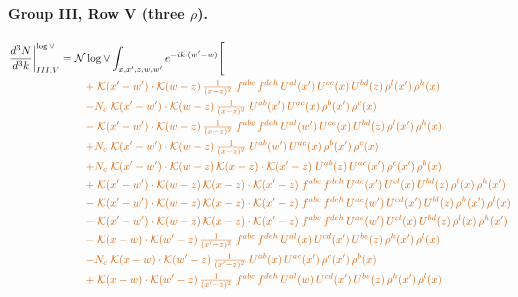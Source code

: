 \documentclass[10pt]{article}
\numberwithin{equation}{section}
\newcommand{\NNv}{\mathcal N\log\vee}
\begin{document}
\paragraph{Group III, Row V (three $\rho$).}
\begin{align}
\frac{d^3N}{d^3k}\bigg|^{\log\vee}_{III.V}={}&\NNv\int_{x,x',z,w,w'}e^{-ik\cdot(w'-w)}\Bigg[\notag\\
&\quad{\color{BFK}+\;\mathcal{K}(x'-w')\cdot\mathcal{K}(w-z)\,\tfrac{1}{(x-z)^{2}}\;f^{abc}\,f^{deh}\,U^{al}(x')\,U^{ce}(x)\,U^{bd}(z)\,\rho^{l}(x')\,\rho^{h}(x)}\notag\\
&\quad{\color{BFK}-N_c\;\mathcal{K}(x'-w')\cdot\mathcal{K}(w-z)\,\tfrac{1}{(x-z)^{2}}\;U^{ab}(x')\,U^{ac}(x)\,\rho^{b}(x')\,\rho^{c}(x)}\notag\\
&\quad{\color{BFK}-\;\mathcal{K}(x'-w')\cdot\mathcal{K}(w-z)\,\tfrac{1}{(x-z)^{2}}\;f^{abc}\,f^{deh}\,U^{al}(w')\,U^{ce}(x)\,U^{bd}(z)\,\rho^{l}(x')\,\rho^{h}(x)}\notag\\
&\quad{\color{BFK}+N_c\;\mathcal{K}(x'-w')\cdot\mathcal{K}(w-z)\,\tfrac{1}{(x-z)^{2}}\;U^{ab}(w')\,U^{ac}(x)\,\rho^{b}(x')\,\rho^{c}(x)}\notag\\
&\quad{\color{BFK}+N_c\;\mathcal{K}(x'-w')\cdot\mathcal{K}(w-z)\,\mathcal{K}(x-z)\cdot\mathcal{K}(x'-z)\;U^{ab}(z)\,U^{ac}(x')\,\rho^{c}(x')\,\rho^{b}(x)}\notag\\
&\quad{\color{BFK}+\;\mathcal{K}(x'-w')\cdot\mathcal{K}(w-z)\,\mathcal{K}(x-z)\cdot\mathcal{K}(x'-z)\;f^{abc}\,f^{deh}\,U^{ae}(x')\,U^{cl}(x)\,U^{bd}(z)\,\rho^{l}(x)\,\rho^{h}(x')}\notag\\
&\quad{\color{BFK}-\;\mathcal{K}(x'-w')\cdot\mathcal{K}(w-z)\,\mathcal{K}(x-z)\cdot\mathcal{K}(x'-z)\;f^{abc}\,f^{deh}\,U^{ae}(w')\,U^{cd}(x')\,U^{bl}(z)\,\rho^{h}(x')\,\rho^{l}(x)}\notag\\
&\quad{\color{BFK}-\;\mathcal{K}(x'-w')\cdot\mathcal{K}(w-z)\,\mathcal{K}(x-z)\cdot\mathcal{K}(x'-z)\;f^{abc}\,f^{deh}\,U^{ae}(w')\,U^{cl}(x)\,U^{bd}(z)\,\rho^{l}(x)\,\rho^{h}(x')}\notag\\
&\quad{\color{BFK}-\;\mathcal{K}(x-w)\cdot\mathcal{K}(w'-z)\,\tfrac{1}{(x'-z)^{2}}\;f^{abc}\,f^{deh}\,U^{al}(x)\,U^{cd}(x')\,U^{be}(z)\,\rho^{h}(x')\,\rho^{l}(x)}\notag\\
&\quad{\color{BFK}-N_c\;\mathcal{K}(x-w)\cdot\mathcal{K}(w'-z)\,\tfrac{1}{(x'-z)^{2}}\;U^{ab}(x)\,U^{ac}(x')\,\rho^{c}(x')\,\rho^{b}(x)}\notag\\
&\quad{\color{BFK}+\;\mathcal{K}(x-w)\cdot\mathcal{K}(w'-z)\,\tfrac{1}{(x'-z)^{2}}\;f^{abc}\,f^{deh}\,U^{al}(w)\,U^{cd}(x')\,U^{be}(z)\,\rho^{h}(x')\,\rho^{l}(x)}\notag\\

\end{align}
\end{document}
